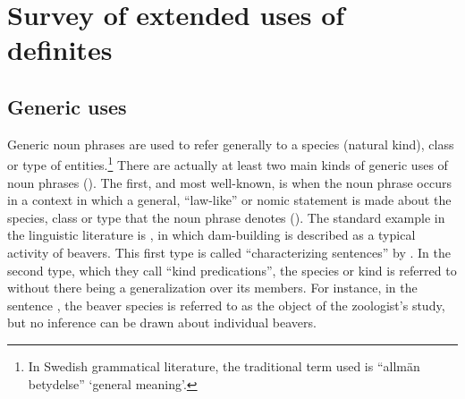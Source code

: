 
\section{\rmfamily Survey of extended uses of definites}
\label{bkm:Ref105226591}\subsection{\rmfamily Generic uses}
\label{bkm:Ref154983693}
Generic noun phrases are used to refer generally to a species (natural kind), class or type of entities.\footnote{ In Swedish grammatical literature, the traditional term used is “allmän betydelse” ‘general meaning’.} There are actually at least two main kinds of generic uses of noun phrases (\citet[19]{KrifkaEtAl1995}). The first, and most well-known, is when the noun phrase occurs in a context in which a general, “law-like” or nomic statement is made about the species, class or type that the noun phrase denotes (\citet{Dahl1973}). The\textbf{ }standard example in the linguistic literature is , in which dam-building is described as a typical activity of beavers. This first type is called “characterizing sentences” by \citet{KrifkaEtAl1995}. In the second type, which they call “kind predications”, the species or kind is referred to without there being a generalization over its members. For instance, in the sentence , the beaver species is referred to as the object of the zoologist’s study, but no inference can be drawn about individual beavers.


